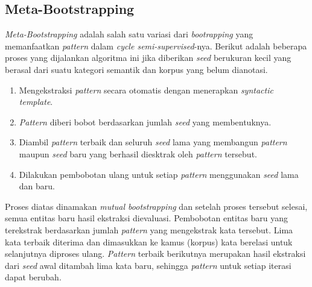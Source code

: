 \subsection{Meta-Bootstrapping}
\textit{Meta-Bootstrapping} adalah salah satu variasi dari \textit{bootrapping} yang memanfaatkan \textit{pattern} dalam \textit{cycle semi-supervised}-nya. Berikut adalah beberapa proses \citep{riloff1999learning} yang dijalankan algoritma ini jika diberikan \textit{seed} berukuran kecil yang berasal dari suatu kategori semantik dan korpus yang belum dianotasi.
\begin{enumerate}
  \item Mengekstraksi \textit{pattern} secara otomatis dengan menerapkan \textit{syntactic template}.
  \item \textit{Pattern} diberi bobot berdasarkan jumlah \textit{seed} yang membentuknya.
  \item Diambil \textit{pattern} terbaik dan seluruh \textit{seed} lama yang membangun \textit{pattern} maupun \textit{seed} baru yang berhasil diesktrak oleh \textit{pattern} tersebut.
  \item Dilakukan pembobotan ulang untuk setiap \textit{pattern} menggunakan \textit{seed} lama dan baru.
\end{enumerate}

Proses diatas dinamakan \textit{mutual bootstrapping} dan setelah proses tersebut selesai, semua entitas baru hasil ekstraksi dievaluasi. Pembobotan entitas baru yang terekstrak berdasarkan jumlah \textit{pattern} yang mengekstrak kata tersebut. Lima kata terbaik diterima dan dimasukkan ke kamus (korpus) kata berelasi untuk selanjutnya diproses ulang. \textit{Pattern} terbaik berikutnya merupakan hasil ekstraksi dari \textit{seed} awal ditambah lima kata baru, sehingga \textit{pattern} untuk setiap iterasi dapat berubah. 

